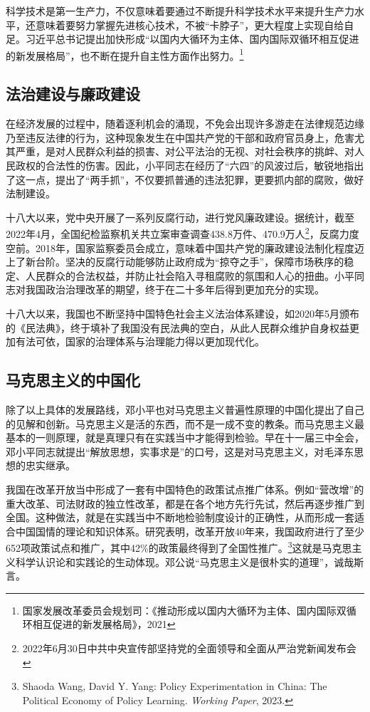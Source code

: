 \documentclass[12pt]{article}
\begin{document}
科学技术是第一生产力，不仅意味着要通过不断提升科学技术水平来提升生产力水平，还意味着要努力掌握先进核心技术，不被“卡脖子”，更大程度上实现自给自足。习近平总书记提出加快形成“以国内大循环为主体、国内国际双循环相互促进的新发展格局”，也不断在提升自主性方面作出努力。\footnote{国家发展改革委员会规划司：《推动形成以国内大循环为主体、国内国际双循环相互促进的新发展格局》，2021}

\subsection{法治建设与廉政建设}
在经济发展的过程中，随着逐利机会的涌现，不免会出现许多游走在法律规范边缘乃至违反法律的行为，这种现象发生在中国共产党的干部和政府官员身上，危害尤其严重，是对人民群众利益的损害、对公平法治的无视、对社会秩序的挑衅、对人民政权的合法性的伤害。因此，小平同志在经历了“六四”的风波过后，敏锐地指出了这一点，提出了“两手抓”，不仅要抓普通的违法犯罪，更要抓内部的腐败，做好法制建设。

十八大以来，党中央开展了一系列反腐行动，进行党风廉政建设。据统计，截至2022年4月，全国纪检监察机关共立案审查调查438.8万件、470.9万人\footnote{2022年6月30日中共中央宣传部坚持党的全面领导和全面从严治党新闻发布会}，反腐力度空前。2018年，国家监察委员会成立，意味着中国共产党的廉政建设法制化程度迈上了新台阶。坚决的反腐行动能够防止政府成为“掠夺之手”，保障市场秩序的稳定、人民群众的合法权益，并防止社会陷入寻租腐败的氛围和人心的扭曲。小平同志对我国政治治理改革的期望，终于在二十多年后得到更加充分的实现。

十八大以来，我国也不断坚持中国特色社会主义法治体系建设，如2020年5月颁布的《民法典》，终于填补了我国没有民法典的空白，从此人民群众维护自身权益更加有法可依，国家的治理体系与治理能力得以更加现代化。

\subsection{马克思主义的中国化}
除了以上具体的发展路线，邓小平也对马克思主义普遍性原理的中国化提出了自己的见解和创新。马克思主义是活的东西，而不是一成不变的教条。而马克思主义最基本的一则原理，就是真理只有在实践当中才能得到检验。早在十一届三中全会，邓小平同志就提出“解放思想，实事求是”的口号，这是对马克思主义，对毛泽东思想的忠实继承。

我国在改革开放当中形成了一套有中国特色的政策试点推广体系。例如“营改增”的重大改革、司法财政的独立性改革，都是在各个地方先行先试，然后再逐步推广到全国。这种做法，就是在实践当中不断地检验制度设计的正确性，从而形成一套适合中国国情的理论和知识体系。研究表明，改革开放40年来，我国政府进行了至少652项政策试点和推广，其中42\%的政策最终得到了全国性推广。\footnote{Shaoda Wang, David Y. Yang: Policy Experimentation in China: The Political Economy of Policy Learning. \textit{Working Paper}, 2023.}这就是马克思主义科学认识论和实践论的生动体现。邓公说“马克思主义是很朴实的道理”，诚哉斯言。
\end{document}
